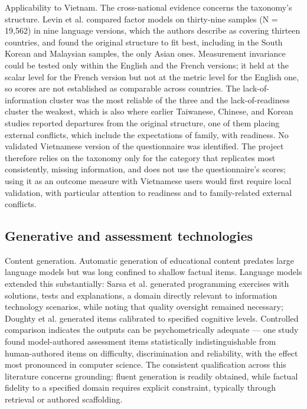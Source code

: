 Applicability to Vietnam. The cross-\allowbreak{}national evidence concerns the taxonomy's structure. Levin et al.\cite{r2} compared factor models on thirty-nine samples (N = 19,562) in nine language versions, which the authors describe as covering thirteen countries, and found the original structure to fit best, including in the South Korean and Malaysian samples, the only Asian ones. Measurement invariance could be tested only within the English and the French versions; it held at the scalar level for the French version but not at the metric level for the English one, so scores are not established as comparable across countries. The lack-\allowbreak{}of-\allowbreak{}information cluster was the most reliable of the three and the lack-\allowbreak{}of-\allowbreak{}readiness cluster the weakest, which is also where earlier Taiwanese, Chinese, and Korean studies reported departures from the original structure\cite{r111,r112,r113}, one of them placing external conflicts, which include the expectations of family, with readiness\cite{r111}. No validated Vietnamese version of the questionnaire was identified. The project therefore relies on the taxonomy only for the category that replicates most consistently, missing information, and does not use the questionnaire's scores; using it as an outcome measure with Vietnamese users would first require local validation, with particular attention to readiness and to family-\allowbreak{}related external conflicts.

\subsection{Generative and assessment technologies}

Content generation. Automatic generation of educational content predates large language models but was long confined to shallow factual items\cite{r48}. Language models extended this substantially: Sarsa et al.\cite{r49} generated programming exercises with solutions, tests and explanations, a domain directly relevant to information technology scenarios, while noting that quality oversight remained necessary; Doughty et al.\cite{r50} generated items calibrated to specified cognitive levels. Controlled comparison indicates the outputs can be psychometrically adequate --- one study found model-\allowbreak{}authored assessment items statistically indistinguishable from human-\allowbreak{}authored items on difficulty, discrimination and reliability, with the effect most pronounced in computer science\cite{r51}. The consistent qualification across this literature concerns grounding: fluent generation is readily obtained, while factual fidelity to a specified domain requires explicit constraint, typically through retrieval or authored scaffolding\cite{r52}.

